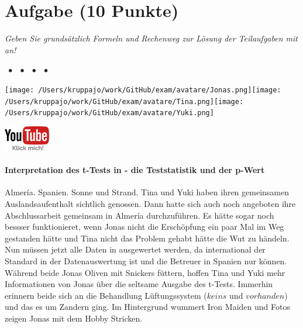 \documentclass[a4paper, 9pt]{scrartcl}\usepackage[]{graphicx}\usepackage[]{xcolor}
\begin{document}
\section{Aufgabe \hfill (10 Punkte)}

\textit{Geben Sie grundsätzlich Formeln und Rechenweg zur Lösung der Teilaufgaben mit an!} \\[1Ex]
 

 
\ifcollection
\begin{flushright}
\tiny\vspace{-3Ex}
\textbf{\examinhaltstart}
\exammodulemathstat $\;\bullet$
\exammodulestat $\;\bullet$
\exammodulestatbbv $\;\bullet$
\exammodulestatversuch $\;\bullet$
\exammodulebiostat
\vspace{-4Ex}
\end{flushright}
\begin{minipage}[t]{0.5\textwidth}
\texttt{[image: /Users/kruppajo/work/GitHub/exam/avatare/Jonas.png]}\hspace{-4mm}\texttt{[image: /Users/kruppajo/work/GitHub/exam/avatare/Tina.png]}\hspace{-4mm}\texttt{[image: /Users/kruppajo/work/GitHub/exam/avatare/Yuki.png]}
\end{minipage}
\begin{minipage}[t]{0.5\textwidth}
\hfill
\href{https://youtu.be/K3LGigegKIg}{\includegraphics[width = 2cm]{img/youtube}}
\end{minipage}
\fi



\ifcollection
\paragraph{Interpretation des t-Tests in \Rlogo - die Teststatistik und der p-Wert}
\fi

Almería. Spanien. Sonne und Strand. Tina und Yuki haben ihren gemeinsamen Auslandsaufenthalt sichtlich genossen. Dann hatte sich auch noch angeboten ihre Abschlussarbeit gemeinsam in Almería durchzuführen. Es hätte sogar noch bessser funktionieret, wenn Jonas nicht die Erschöpfung ein paar Mal im Weg gestanden hätte und Tina nicht das Problem gehabt hätte die Wut zu händeln. Nun müssen jetzt alle Daten in \Rlogo ausgewertet werden, da \Rlogo international der Standard in der Datenauswertung ist und die Betreuer in Spanien nur \Rlogo können. Während beide Jonas Oliven mit Snickers füttern, hoffen Tina und Yuki mehr Informationen von Jonas über die seltsame \Rlogo Ausgabe des t-Tests. Immerhin erinnern beide sich an die Behandlung Lüftungssystem ($keins$ und $vorhanden$) und das es um Zandern ging. Im Hintergrund wummert Iron Maiden und Fotos zeigen Jonas mit dem Hobby Stricken.
\end{document}
